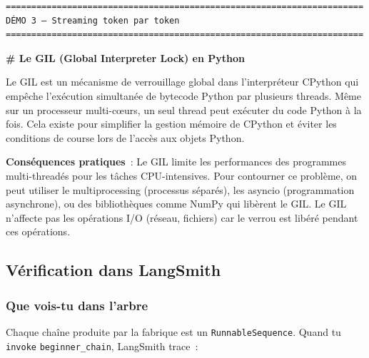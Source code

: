 \documentclass[11pt,a4paper]{article}
\begin{document}
\begin{tcolorbox}[
  colback=white,
  colframe=black!50,
  coltitle=black,
  fonttitle=\footnotesize\bfseries,
  fontupper=\footnotesize,
  title=Sortie de l'exécution,
  breakable,
]
\begin{verbatim}
======================================================================
DÉMO 3 — Streaming token par token
======================================================================
\end{verbatim}

\textbf{\# Le GIL (Global Interpreter Lock) en Python}

Le GIL est un mécanisme de verrouillage global dans l'interpréteur CPython
qui empêche l'exécution simultanée de bytecode Python par plusieurs threads.
Même sur un processeur multi-cœurs, un seul thread peut exécuter du code
Python à la fois. Cela existe pour simplifier la gestion mémoire de CPython
et éviter les conditions de course lors de l'accès aux objets Python.

\textbf{Conséquences pratiques}~: Le GIL limite les performances des
programmes multi-threadés pour les tâches CPU-intensives. Pour contourner ce
problème, on peut utiliser le multiprocessing (processus séparés), les
asyncio (programmation asynchrone), ou des bibliothèques comme NumPy qui
libèrent le GIL. Le GIL n'affecte pas les opérations I/O (réseau, fichiers)
car le verrou est libéré pendant ces opérations.
\end{tcolorbox}

\subsection{Vérification dans LangSmith}

\subsubsection*{Que vois-tu dans l'arbre}

Chaque chaîne produite par la fabrique est un \texttt{RunnableSequence}.
Quand tu \texttt{invoke} \texttt{beginner\_chain}, LangSmith trace~:

\begin{center}
\end{center}
\end{document}
